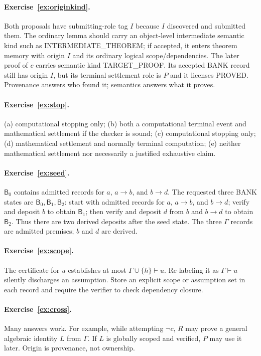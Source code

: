 \documentclass[11pt,openany]{book}
\theoremstyle{definition}
\theoremstyle{remark}
\newcommand{\Bank}{\mathsf{B}}
\begin{document}
\paragraph{Exercise~\ref{ex:originkind}.}
Both proposals have submitting-role tag $I$ because $I$ discovered and submitted them. The ordinary lemma should carry an object-level intermediate semantic kind such as \textsf{INTERMEDIATE\_THEOREM}; if accepted, it enters theorem memory with origin $I$ and its ordinary logical scope/dependencies. The later proof of $c$ carries semantic kind \textsf{TARGET\_PROOF}. Its accepted BANK record still has origin $I$, but its terminal settlement role is $P$ and it licenses \textsf{PROVED}. Provenance answers who found it; semantics answers what it proves.

\paragraph{Exercise~\ref{ex:stop}.}
(a) computational stopping only; (b) both a computational terminal event and mathematical settlement if the checker is sound; (c) computational stopping only; (d) mathematical settlement and normally terminal computation; (e) neither mathematical settlement nor necessarily a justified exhaustive claim.

\paragraph{Exercise~\ref{ex:seed}.}
$\Bank_0$ contains admitted records for $a$, $a\to b$, and $b\to d$. The requested three BANK states are $\Bank_0,\Bank_1,\Bank_2$: start with admitted records for $a$, $a\to b$, and $b\to d$; verify and deposit $b$ to obtain $\Bank_1$; then verify and deposit $d$ from $b$ and $b\to d$ to obtain $\Bank_2$. Thus there are two derived deposits after the seed state. The three $\Gamma$ records are admitted premises; $b$ and $d$ are derived.

\paragraph{Exercise~\ref{ex:scope}.}
The certificate for $u$ establishes at most $\Gamma\cup\{h\}\vdash u$. Re-labeling it as $\Gamma\vdash u$ silently discharges an assumption. Store an explicit scope or assumption set in each record and require the verifier to check dependency closure.

\paragraph{Exercise~\ref{ex:cross}.}
Many answers work. For example, while attempting $\neg c$, $R$ may prove a general algebraic identity $L$ from $\Gamma$. If $L$ is globally scoped and verified, $P$ may use it later. Origin is provenance, not ownership.
\end{document}
